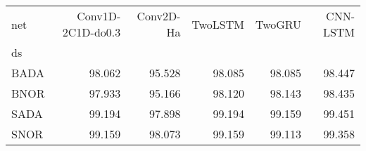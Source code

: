 \begin{tabular}{lrrrrr}
\toprule
net &  Conv1D-2C1D-do0.3 &  Conv2D-Ha &  TwoLSTM &  TwoGRU &  CNN-LSTM \\
ds   &                    &            &          &         &           \\
\midrule
BADA &             98.062 &     95.528 &   98.085 &  98.085 &    98.447 \\
BNOR &             97.933 &     95.166 &   98.120 &  98.143 &    98.435 \\
SADA &             99.194 &     97.898 &   99.194 &  99.159 &    99.451 \\
SNOR &             99.159 &     98.073 &   99.159 &  99.113 &    99.358 \\
\bottomrule
\end{tabular}
